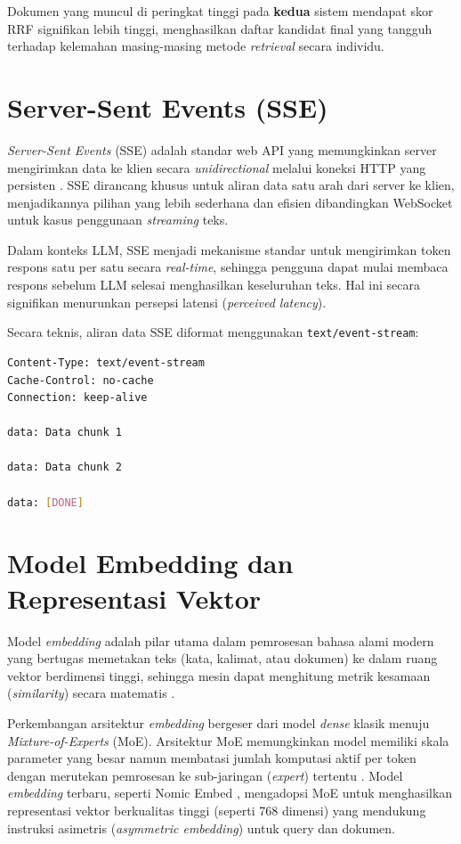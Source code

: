 Dokumen yang muncul di peringkat tinggi pada \textbf{kedua} sistem mendapat skor RRF
signifikan lebih tinggi, menghasilkan daftar kandidat final yang tangguh terhadap kelemahan
masing-masing metode \textit{retrieval} secara individu.

\section{Server-Sent Events (SSE)}
\textit{Server-Sent Events} (SSE) adalah standar web API yang memungkinkan server
mengirimkan data ke klien secara \textit{unidirectional} melalui koneksi HTTP yang
persisten \cite{W3C2015}. SSE dirancang khusus untuk aliran data satu arah dari server
ke klien, menjadikannya pilihan yang lebih sederhana dan efisien dibandingkan WebSocket
untuk kasus penggunaan \textit{streaming} teks.

Dalam konteks LLM, SSE menjadi mekanisme standar untuk mengirimkan token respons
satu per satu secara \textit{real-time}, sehingga pengguna dapat mulai membaca
respons sebelum LLM selesai menghasilkan keseluruhan teks. Hal ini secara signifikan
menurunkan persepsi latensi (\textit{perceived latency}).

Secara teknis, aliran data SSE diformat menggunakan \texttt{text/event-stream}:

\begin{lstlisting}[language=bash, caption={Struktur Dasar Payload SSE}]
Content-Type: text/event-stream
Cache-Control: no-cache
Connection: keep-alive

data: Data chunk 1

data: Data chunk 2

data: [DONE]
\end{lstlisting}

\section{Model Embedding dan Representasi Vektor}
Model \textit{embedding} adalah pilar utama dalam pemrosesan bahasa alami modern yang
bertugas memetakan teks (kata, kalimat, atau dokumen) ke dalam ruang vektor
berdimensi tinggi, sehingga mesin dapat menghitung metrik kesamaan (\textit{similarity})
secara matematis \cite{Mikolov2013}.

Perkembangan arsitektur \textit{embedding} bergeser dari model \textit{dense} klasik
menuju \textit{Mixture-of-Experts} (MoE). Arsitektur MoE memungkinkan model memiliki
skala parameter yang besar namun membatasi jumlah komputasi aktif per token dengan merutekan
pemrosesan ke sub-jaringan (\textit{expert}) tertentu \cite{Shazeer2017}. Model \textit{embedding}
terbaru, seperti Nomic Embed \cite{NomicAI2024}, mengadopsi MoE untuk menghasilkan representasi
vektor berkualitas tinggi (seperti 768 dimensi) yang mendukung instruksi asimetris (\textit{asymmetric embedding})
untuk query dan dokumen.

